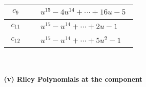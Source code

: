 \documentclass[1p]{elsarticle_modified}
\theoremstyle{definition}
\begin{document}
\begin{tabular}{m{50pt}|m{274pt}}
\hline $$\begin{aligned}c_{9}\end{aligned}$$&$\begin{aligned}
&u^{15}-4 u^{14}+\cdots+16 u-5
\end{aligned}$\\
\hline $$\begin{aligned}c_{11}\end{aligned}$$&$\begin{aligned}
&u^{15}- u^{14}+\cdots+2 u-1
\end{aligned}$\\
\hline $$\begin{aligned}c_{12}\end{aligned}$$&$\begin{aligned}
&u^{15}- u^{14}+\cdots+5 u^2-1
\end{aligned}$\\
\hline
\end{tabular}\\~\\
\newpage\renewcommand{\arraystretch}{1}
\flushleft \textbf{(v) Riley Polynomials at the component}\newline \\
\end{document}
